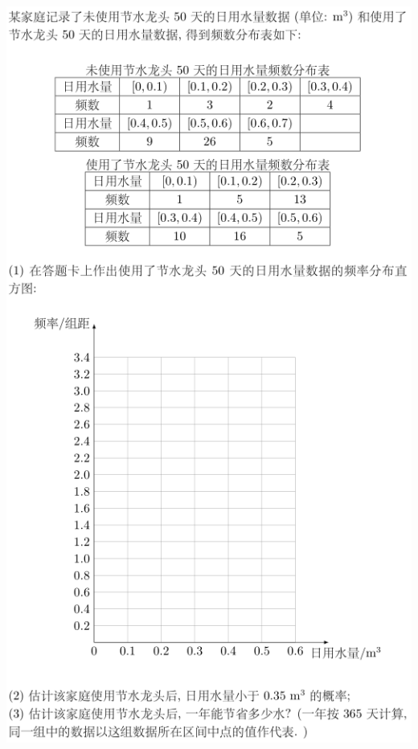 \documentclass[11pt,a4paper]{ctexart}
\begin{document}
\begin{paracol}{2}
\includegraphics[width=\linewidth]{2018w19.png}
\newpage
{}


\end{paracol}
\end{document}

